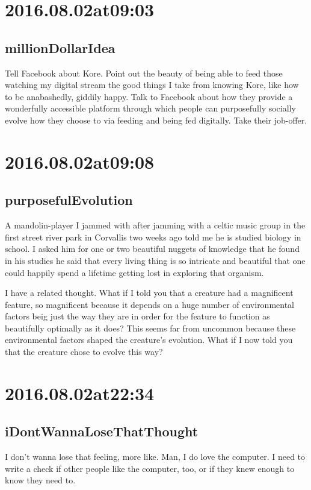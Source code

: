 \begin{enumerate}
\begin{enumerate}
\section*{ 2016.08.02at09:03 }
\subsection*{ millionDollarIdea }
Tell Facebook about Kore. Point out the beauty of being able to feed those watching my digital stream the good things I take from knowing Kore, like how to be anabashedly, giddily happy. Talk to Facebook about how they provide a wonderfully accessible platform through which people can purposefully socially evolve how they choose to via feeding and being fed digitally. Take their job-offer.

\section*{ 2016.08.02at09:08 }
\subsection*{ purposefulEvolution }
A mandolin-player I jammed with after jamming with a celtic music group in the first street river park in Corvallis two weeks ago told me he is studied biology in school. I asked him for one or two beautiful nuggets of knowledge that he found in his studies he said that every living thing is so intricate and beautiful that one could happily spend a lifetime getting lost in exploring that organism.

I have a related thought. What if I told you that a creature had a magnificent feature, so magnificent because it depends on a huge number of environmental factors beig just the way they are in order for the feature to function as beautifully optimally as it does? This seems far from uncommon because these environmental factors shaped the creature's evolution. What if I now told you that the creature chose to evolve this way?

\section*{ 2016.08.02at22:34 }
\subsection*{ iDontWannaLoseThatThought }
I don't wanna lose that feeling, more like. Man, I do love the computer. I need to write a check if other people like the computer, too, or if they knew enough to know they need to. 


\end{enumerate}
\end{enumerate}
